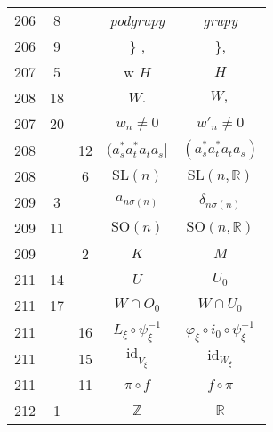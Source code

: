 \documentclass[a4paper,11pt]{article}
\newcommand{\mb}{\mathbb}
\newcommand{\mr}{\mathrm}
\newcommand{\id}{\mr{id}}
\newcommand{\SO}{\mr{SO}}
\newcommand{\SL}{\mr{SL}}
\newcommand{\del}{\delta}
\newcommand{\vp}{\varphi}
\newcommand{\s}{\sigma}
\newcommand{\R}{\mb{R}}
\newcommand{\Z}{\mb{Z}}
\newcommand{\wt}{\widetilde}
\begin{document}
\begin{center}
\begin{tabular}{|c|c|c|c|c|}
    206 &  8 & & \emph{podgrupy} & \emph{grupy} \\
    206 &  9 & & \} , & \}, \\
    207 &  5 & & w $H$ & $H$ \\
    208 & 18 & & $W.$ & $W,$ \\
    207 & 20 & & $w_{ n } \neq 0$ & $w'_{ n } \neq 0$ \\
    208 & & 12 & $( a^{ * }_{ s } a^{ * }_{ t } a_{ t } a_{ s } |$
           & $( a^{ * }_{ s } a^{ * }_{ t } a_{ t } a_{ s } )$ \\
    208 & & 6 & $\SL( n )$ & $\SL( n, \R )$ \\
    209 &  3 & & $a_{ n \s( n ) }$ & $\del_{ n \s( n ) }$ \\
    209 & 11 & & $\SO( n )$ & $\SO( n, \R )$ \\
    209 & & 2 & $K$ & $M$ \\
    211 & 14 & & $U$ & $U_{ 0 }$ \\
    211 & 17 & & $W \! \cap \! O_{ 0 }$ & $W \! \cap \! U_{ 0 }$ \\
    211 & & 16 & $L_{ \xi } \circ \psi_{ \xi }^{ -1 }$
           & $\vp_{ \xi } \circ i_{ 0 } \circ \psi_{ \xi }^{ -1 }$ \\
    211 & & 15 & $\id_{ \wt{ V }_{ \xi } }$ & $\id_{ W_{ \xi } }$ \\
    211 & & 11 & $\pi \circ f$ & $f \circ \pi$ \\
    212 & 1 & & $\Z$ & $\R$ \\ \hline
  \end{tabular}


\end{center}
\end{document}
